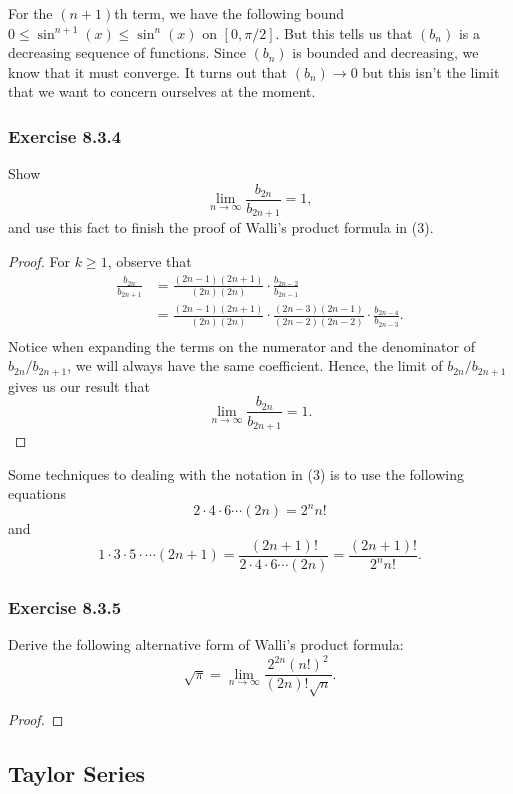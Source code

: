 For the \( (n+1) \)th term, we have the following bound \(  0 \leq \sin^{n+1}(x) \leq \sin^{n}(x)  \) on \( [0, \pi / 2]  \). But this tells us that \( (b_{n})  \) is a decreasing sequence of functions.  Since \( (b_{n}) \) is bounded and decreasing, we know that it must converge. It turns out that \( (b_{n}) \to 0  \) but this isn't the limit that we want to concern ourselves at the moment. 

\subsubsection{Exercise 8.3.4} Show 
\[  \lim_{ n \to \infty  }  \frac{ b_{2n} }{  b_{2n+1} }  = 1,  \] and use this fact to finish the proof of Walli's product formula in (3).
\begin{proof}
For \( k \geq 1  \), observe that
\begin{align*}
  \frac{ b_{2n} }{  b_{2n+1} }   &= \frac{ (2n-1) (2n+1)  }{ (2n)(2n) } \cdot \frac{ b_{2n-2}  }{ b_{2n-1} }   \\
                                 &= \frac{ (2n-1) (2n+1)  }{ (2n)(2n)  } \cdot \frac{ (2n-3) (2n-1)  }{ (2n-2) (2n-2)  } \cdot \frac{ b_{2n-4}  }{ b_{2n-3} } . \\ 
\end{align*}
Notice when expanding the terms on the numerator and the denominator of \( b_{2n} / b_{2n+1} \), we will always have the same coefficient. Hence, the limit of \( b_{2n} / b_{2n+1} \) gives us our result that 
\[  \lim_{ n \to \infty  }  \frac{ b_{2n}  }{  b_{2n+1} } = 1. \]
\end{proof}

Some techniques to dealing with the notation in (3) is to use the following equations 
\[  2 \cdot 4 \cdot 6 \dotsb (2n) = 2^{n} n! \] and
\[  1 \cdot 3 \cdot 5 \cdot \dotsb (2n+1) = \frac{ (2n+1)! }{  2 \cdot 4 \cdot 6 \dotsb (2n)  } = \frac{ (2n+1)! }{ 2^{n} n! }. \]


\subsubsection{Exercise 8.3.5} Derive the following alternative form of Walli's product formula: 
\[  \sqrt{ \pi }  = \lim_{ n \to \infty    }  \frac{ 2^{2n} (n!)^2  }{ (2n)! \sqrt{ n }  }. \]
\begin{proof}




\end{proof}

\subsection{Taylor Series} 

